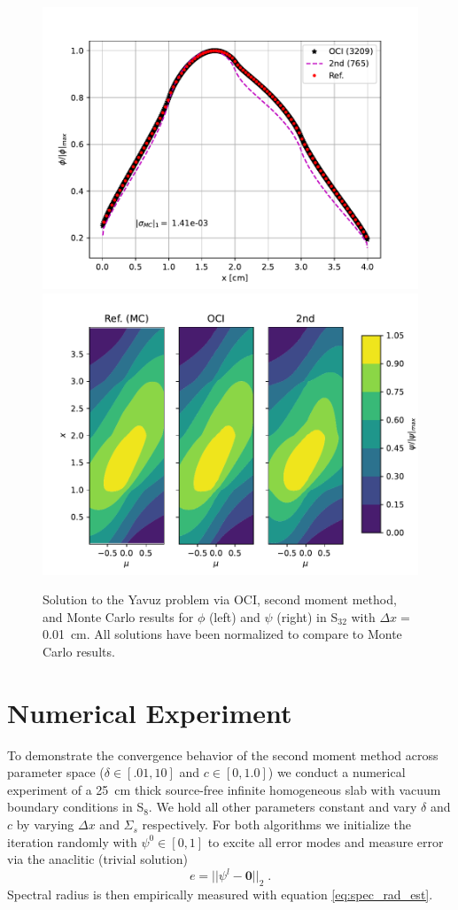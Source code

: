 \begin{figure}
    \centering
    \includegraphics[width=.49\linewidth]{figures/smm_paper/yavuz_normalized_fluxes.pdf}
    \includegraphics[width=.49\linewidth]{figures/smm_paper/yavuz_af.pdf}
    \caption{Solution to the Yavuz problem via OCI, second moment method, and Monte Carlo results for $\phi$ (left) and $\psi$ (right) in S$_{32}$ with $\Delta x =$\SI{0.01}{\centi\meter}. All solutions have been normalized to compare to Monte Carlo results.}
    \label{fig:yavuz}
\end{figure}


\section{Numerical Experiment}

To demonstrate the convergence behavior of the second moment method across parameter space ($\delta \in [.01,10]$ and $c \in [0,1.0]$) we conduct a numerical experiment of a \SI{25}{\centi\meter} thick source-free infinite homogeneous slab with vacuum boundary conditions in S$_8$.
We hold all other parameters constant and vary $\delta$ and $c$ by varying $\Delta x$ and $\Sigma_s$ respectively.
For both algorithms we initialize the iteration randomly with $\psi^{0} \in [0, 1]$ to excite all error modes and measure error via the anaclitic (trivial solution)
\begin{equation}
    e = ||\psi^l - \bm{0}||_2 \;.
\end{equation}
Spectral radius is then empirically measured with equation \ref{eq:spec_rad_est}.

